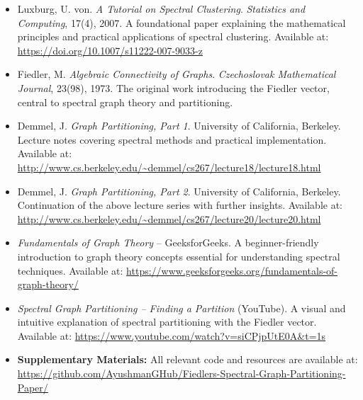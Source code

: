 \documentclass[hidelinks,12pt]{article}
\begin{document}
\begin{itemize}
    \item Luxburg, U. von. \textit{A Tutorial on Spectral Clustering}. \textit{Statistics and Computing}, 17(4), 2007. A foundational paper explaining the mathematical principles and practical applications of spectral clustering. Available at: \url{https://doi.org/10.1007/s11222-007-9033-z}
    
    \item Fiedler, M. \textit{Algebraic Connectivity of Graphs}. \textit{Czechoslovak Mathematical Journal}, 23(98), 1973. The original work introducing the Fiedler vector, central to spectral graph theory and partitioning.

    \item Demmel, J. \textit{Graph Partitioning, Part 1}. University of California, Berkeley. Lecture notes covering spectral methods and practical implementation. Available at: \url{http://www.cs.berkeley.edu/~demmel/cs267/lecture18/lecture18.html}

    \item Demmel, J. \textit{Graph Partitioning, Part 2}. University of California, Berkeley. Continuation of the above lecture series with further insights. Available at: \url{http://www.cs.berkeley.edu/~demmel/cs267/lecture20/lecture20.html}

    \item \textit{Fundamentals of Graph Theory} – GeeksforGeeks. A beginner-friendly introduction to graph theory concepts essential for understanding spectral techniques. Available at: \url{https://www.geeksforgeeks.org/fundamentals-of-graph-theory/}

    \item \textit{Spectral Graph Partitioning – Finding a Partition} (YouTube). A visual and intuitive explanation of spectral partitioning with the Fiedler vector. Available at: \url{https://www.youtube.com/watch?v=siCPjpUtE0A&t=1s}
    
    \item \textbf{Supplementary Materials:} All relevant code and resources are available at: \url{https://github.com/AyushmanGHub/Fiedlers-Spectral-Graph-Partitioning-Paper/}
\end{itemize}


\end{document}
